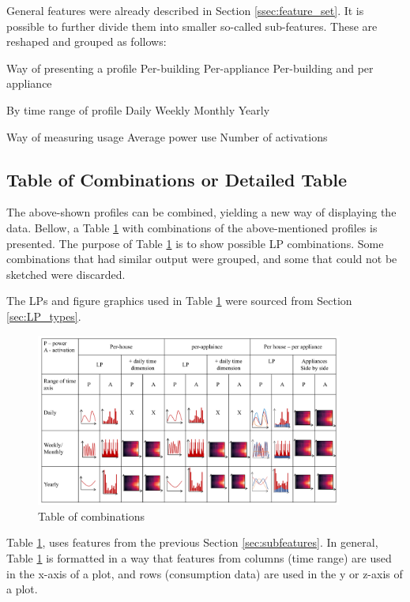 General features were already described in Section \ref{ssec:feature_set}.
It is possible to further divide them into smaller so-called sub-features.
These are reshaped and grouped as follows:
\begin{outline}

\1 Way of presenting a profile
\2 Per-building 
\2 Per-appliance 
\2 Per-building and per appliance

\1 By time range of profile 
\2 Daily
\2 Weekly
\2 Monthly
\2 Yearly

\1 Way of measuring usage
\2 Average power use 
\2 Number of activations
\end{outline}


\subsection{Table of Combinations or Detailed Table}
\label{ssec:table_of_combinations}
The above-shown profiles can be combined, yielding a new way of displaying the data.
Bellow, a Table \ref{fig:map_fig} with combinations of the above-mentioned profiles is presented. 
The purpose of Table \ref{fig:map_fig} is to show possible LP combinations.
Some combinations that had similar output were grouped, and some that could not be sketched were discarded. 

The LPs and figure graphics used in Table \ref{fig:map_fig} were sourced from Section \ref{sec:LP_types}.

\begin{figure}
	\centering
	\includegraphics[width=0.9\textwidth]{Figures/profile_sketches/slide14.pdf}
  \caption{Table of combinations}
  \label{fig:map_fig}
\end{figure}

Table \ref{fig:map_fig}, uses features from the previous Section \ref{sec:subfeatures}. 
In general, Table \ref{fig:map_fig} is formatted in a way that features from columns (time range) are
used in the x-axis of a plot, and rows (consumption data) are used in the y or z-axis of a plot. 

